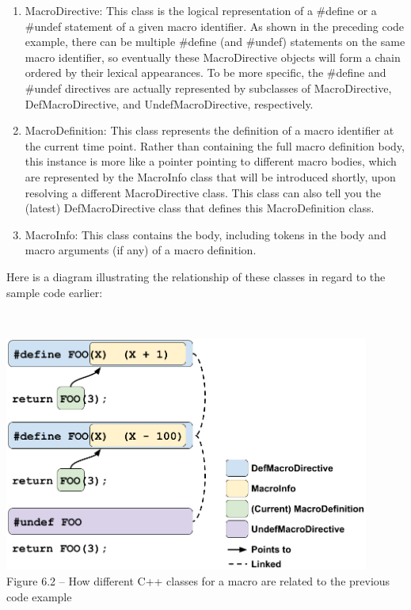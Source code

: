\begin{enumerate}
\item MacroDirective: This class is the logical representation of a \#define or a \#undef statement of a given macro identifier. As shown in the preceding code example, there can be multiple \#define (and \#undef) statements on the same macro identifier, so eventually these MacroDirective objects will form a chain ordered by their lexical appearances. To be more specific, the \#define and \#undef directives are actually represented by subclasses of MacroDirective, DefMacroDirective, and UndefMacroDirective, respectively.

\item MacroDefinition: This class represents the definition of a macro identifier at the current time point. Rather than containing the full macro definition body, this instance is more like a pointer pointing to different macro bodies, which are represented by the MacroInfo class that will be introduced shortly, upon resolving a different MacroDirective class. This class can also tell you the (latest) DefMacroDirective class that defines this MacroDefinition class.

\item MacroInfo: This class contains the body, including tokens in the body and macro arguments (if any) of a macro definition.

\end{enumerate}

Here is a diagram illustrating the relationship of these classes in regard to the sample code earlier:

\hspace*{\fill} \\ %
\begin{center}
\includegraphics[width=0.9\textwidth]{content/2/chapter6/images/2.png}\\
Figure 6.2 – How different C++ classes for a macro are related to the previous code example
\end{center}


